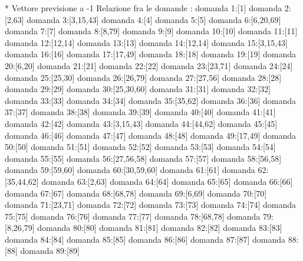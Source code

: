 * Vettore previsione a -1
Relazione fra le domande :
domanda 1:[1]
domanda 2:[2,63]
domanda 3:[3,15,43]
domanda 4:[4]
domanda 5:[5]
domanda 6:[6,20,69]
domanda 7:[7]
domanda 8:[8,79]
domanda 9:[9]
domanda 10:[10]
domanda 11:[11]
domanda 12:[12,14]
domanda 13:[13]
domanda 14:[12,14]
domanda 15:[3,15,43]
domanda 16:[16]
domanda 17:[17,49]
domanda 18:[18]
domanda 19:[19]
domanda 20:[6,20]
domanda 21:[21]
domanda 22:[22]
domanda 23:[23,71]
domanda 24:[24]
domanda 25:[25,30]
domanda 26:[26,79]
domanda 27:[27,56]
domanda 28:[28]
domanda 29:[29]
domanda 30:[25,30,60]
domanda 31:[31]
domanda 32:[32]
domanda 33:[33]
domanda 34:[34]
domanda 35:[35,62]
domanda 36:[36]
domanda 37:[37]
domanda 38:[38]
domanda 39:[39]
domanda 40:[40]
domanda 41:[41]
domanda 42:[42]
domanda 43:[3,15,43]
domanda 44:[44,62]
domanda 45:[45]
domanda 46:[46]
domanda 47:[47]
domanda 48:[48]
domanda 49:[17,49]
domanda 50:[50]
domanda 51:[51]
domanda 52:[52]
domanda 53:[53]
domanda 54:[54]
domanda 55:[55]
domanda 56:[27,56,58]
domanda 57:[57]
domanda 58:[56,58]
domanda 59:[59,60]
domanda 60:[30,59,60]
domanda 61:[61]
domanda 62:[35,44,62]
domanda 63:[2,63]
domanda 64:[64]
domanda 65:[65]
domanda 66:[66]
domanda 67:[67]
domanda 68:[68,78]
domanda 69:[6,69]
domanda 70:[70]
domanda 71:[23,71]
domanda 72:[72]
domanda 73:[73]
domanda 74:[74]
domanda 75:[75]
domanda 76:[76]
domanda 77:[77]
domanda 78:[68,78]
domanda 79:[8,26,79]
domanda 80:[80]
domanda 81:[81]
domanda 82:[82]
domanda 83:[83]
domanda 84:[84]
domanda 85:[85]
domanda 86:[86]
domanda 87:[87]
domanda 88:[88]
domanda 89:[89]

